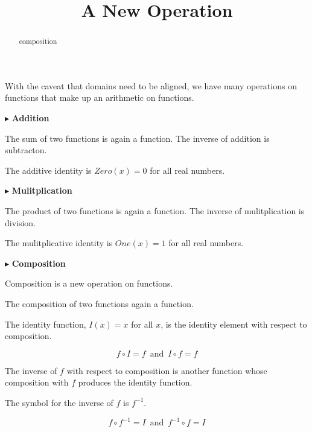 \documentclass{ximera}
\title{A New Operation}
\begin{document}
\begin{abstract}
composition
\end{abstract}
\maketitle





With the caveat that domains need to be aligned, we have many operations on functions that make up an arithmetic on functions.




$\blacktriangleright$ \textbf{Addition} 

The sum of two functions is again a function. The inverse of addition is subtracton. 

The additive identity is $Zero(x) = 0$ for all real numbers.




$\blacktriangleright$ \textbf{Mulitplication} 

The product of two functions is again a function. The inverse of mulitplication is division. 

The mulitplicative identity is $One(x) = 1$ for all real numbers.



$\blacktriangleright$ \textbf{Composition} 

Composition is a new operation on functions.

The composition of two functions again a function. 

The identity function, $I(x) = x$ for all $x$, is the identity element with respect to composition.



\[   f \circ I = f    \, \text{ and } \, I \circ f = f        \]



The inverse of $f$ with respect to composition is another function whose composition with $f$ produces the identity function.

The symbol for the inverse of $f$ is $f^{-1}$.

\[   f \circ f^{-1} = I    \, \text{ and } \, f^{-1} \circ f = I       \]
\end{document}
